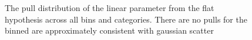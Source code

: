 \begin{figure}[h!]
  \centering
  ~~
  \\
  ~~
  \\
  \caption{\label{fig:frenchFlagPulls} The pull distribution of the linear parameter from the flat hypothesis across all
  \scalht bins and categories. There are no pulls for the \scalht binned are approximately consistent with gaussian scatter}
\end{figure}

